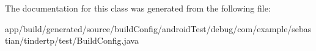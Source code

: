 The documentation for this class was generated from the following file\+:\begin{DoxyCompactItemize}
\item 
app/build/generated/source/build\+Config/android\+Test/debug/com/example/sebastian/tindertp/test/Build\+Config.\+java\end{DoxyCompactItemize}
